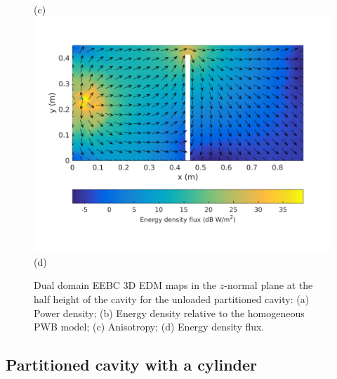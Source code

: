 \documentclass[a4paper]{article}
\numberwithin{equation}{section}
\begin{document}
\begin{figure}[ht]
\begin{center}
{\footnotesize (c)}\\
\vspace{2mm}
\includegraphics[trim={0 13mm 0 12mm},clip,width=0.53\linewidth]{figures/DDM-EEBC_3D_DU_EnergyDensityFluxMap}\\
{\footnotesize (d)}\\
\vspace{-2mm}
\caption{\label{fg:partemptysdm_maps} Dual domain EEBC 3D EDM maps in the $z$-normal plane at the half height of the cavity for the 
unloaded partitioned cavity: (a) Power density; (b) Energy density relative to the homogeneous PWB model;
(c) Anisotropy; (d) Energy density flux.}
\end{center}
\end{figure}

\subsection[Partitioned cavity with a cylinder]{Partitioned cavity with a cylinder}
\label{sc:res:cylpart}
\end{document}
